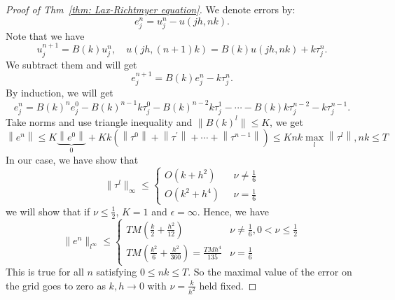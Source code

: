 \begin{proof}[Proof of Thm~\ref{thm: Lax-Richtmyer equation}] 
We denote errors by: 
\[
    e_j^n = u_j^n - u(jh, nk). 
\]
Note that we have 
\[
    u_j^{n+1}=B(k) u^n_j, \quad u(jh, (n+1)k) = B(k) u(jh, nk) + k \tau_j^n. 
\]
We subtract them and will get 
\[
    e_j^{n+1} = B(k) e_j^n - k \tau_j^n. 
\]
By induction, we will get 
\[
    e_j^n = B(k)^n e_j^0 - B(k)^{n-1} k \tau_j^0 - B(k)^{n-2} k \tau_j^1 - \cdots - B(k) k\tau_j^{n-2} - k \tau_j^{n-1}. 
\]
Take norms and use triangle inequality and $\|B(k)^l\|\le K$, we get 
$$
\left\|e^n\right\| \leqslant K \underbrace{\left\|e^0\right\|}_0+K k\left(\left\|\tau^0\right\|+\left\|\tau^{\prime}\right\|+\cdots+\left\|\tau^{n-1}\right\|\right) \le K n k \max _l\left\|\tau^l\right\|, n k \leqslant T
$$
In our case, we have show that 
\[
    \|\tau^l\|_\infty \le \begin{cases}
        O(k+h^2) \quad & \nu \neq \frac{1}{6}\\ 
        O(k^2 +h^4) & \nu =\frac{1}{6}
    \end{cases}
\]
we will show that if $\nu\le \frac{1}{2}$, $K=1$ and $\epsilon =\infty$.  Hence, we have 
\[
    \|e^n\|_{l^\infty} \le \begin{cases}
        TM\left( \frac{k}{2} + \frac{h^2}{12} \right) \quad & \nu \neq \frac{1}{6}, 0<\nu \le \frac{1}{2} \\ 
        TM\left( \frac{k^2}{6} + \frac{h^2}{360} \right) = \frac{TMh^4}{135} &\nu = \frac{1}{6}
    \end{cases}
\]
This is true for all $n$ satisfying $0\le nk\le T$.  So the maximal value of the error on the grid goes to zero as $k,h\to 0$ with $\nu = \frac{k}{h^2}$ held fixed. 
\end{proof}